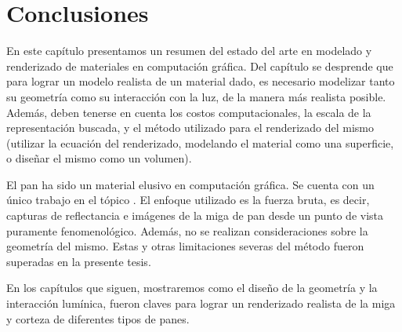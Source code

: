 \section{Conclusiones}
En este capítulo presentamos un resumen del estado del arte en modelado y renderizado de materiales en computación gráfica.
Del capítulo se desprende que para lograr un modelo realista de un material dado, es necesario modelizar tanto su geometría como su interacción con la luz, de la manera más realista posible.
Además, deben tenerse en cuenta los costos computacionales, la escala de la representación buscada, y el método utilizado para el renderizado del mismo (utilizar la ecuación del renderizado, modelando el material como una superficie, o diseñar el mismo como un volumen).

El pan ha sido un material elusivo en computación gráfica.
Se cuenta con un único trabajo en el tópico \cite{Tong2005}.
El enfoque utilizado es la fuerza bruta, es decir, capturas de reflectancia e imágenes de la miga de pan desde un punto de vista puramente fenomenológico.
Además, no se realizan consideraciones sobre la geometría del mismo.
Estas y otras limitaciones severas del método fueron superadas en la presente tesis.

En los capítulos que siguen, mostraremos como el diseño de la geometría y la interacción lumínica, fueron claves para lograr un renderizado realista de la miga y corteza de diferentes tipos de panes.

